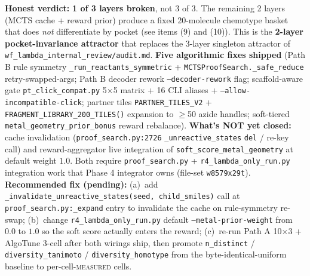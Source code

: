 \begin{enumerate}
  \textbf{Honest verdict:} \textbf{1 of 3 layers broken}, not 3 of 3. The remaining 2 layers (MCTS cache + reward prior) produce a fixed 20-molecule chemotype basket that does \emph{not} differentiate by pocket (see items (9) and (10)). This is the \textbf{2-layer pocket-invariance attractor} that replaces the 3-layer singleton attractor of \texttt{wf\_lambda\_internal\_review/audit.md}. \textbf{Five algorithmic fixes shipped} (Path B rule symmetry \texttt{\_run\_reactants\_symmetric} + \texttt{MCTSProofSearch.\_safe\_reduce} retry-swapped-args; Path B decoder rework \texttt{--decoder-rework} flag; scaffold-aware gate \texttt{pt\_click\_compat.py} 5$\times$5 matrix + 16 CLI aliases + \texttt{--allow-incompatible-click}; partner tiles \texttt{PARTNER\_TILES\_V2} + \texttt{FRAGMENT\_LIBRARY\_200\_TILES()} expansion to $\geq$50 azide handles; soft-tiered \texttt{metal\_geometry\_prior\_bonus} reward rebalance). \textbf{What's NOT yet closed:} cache invalidation (\texttt{proof\_search.py:2726} \texttt{\_unreactive\_states} \texttt{del} / re-key call) and reward-aggregator live integration of \texttt{soft\_score\_metal\_geometry} at default weight $1.0$. Both require \texttt{proof\_search.py} + \texttt{r4\_lambda\_only\_run.py} integration work that Phase 4 integrator owns (file-set \texttt{w8579x29t}). \textbf{Recommended fix (pending):} (a)~add \texttt{\_invalidate\_unreactive\_states(seed, child\_smiles)} call at \texttt{proof\_search.py:\_expand} entry to invalidate the cache on rule-symmetry re-swap; (b)~change \texttt{r4\_lambda\_only\_run.py} default \texttt{--metal-prior-weight} from $0.0$ to $1.0$ so the soft score actually enters the reward; (c)~re-run Path A 10$\times$3 + AlgoTune 3-cell after both wirings ship, then promote \texttt{n\_distinct} / \texttt{diversity\_tanimoto} / \texttt{diversity\_homotype} from the byte-identical-uniform baseline to per-cell-\textsc{measured} cells.


\end{enumerate}
